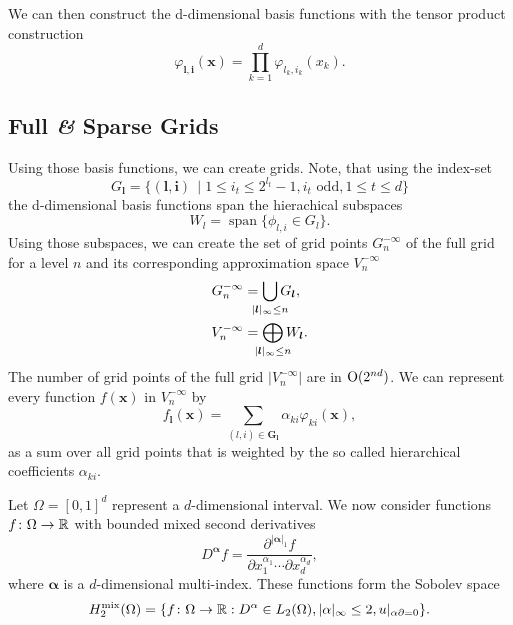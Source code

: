 We can then construct the d-dimensional basis functions with the tensor product construction~\cite{bungartzSparse}
\begin{equation*}
\varphi_{\bm{l}, \bm{i}} (\bm{x}) = \prod_{k=1}^d \varphi_{l_k, i_k} (x_k).
\end{equation*}

\subsection{Full \textit{\&} Sparse Grids}
Using those basis functions, we can create grids.
Note, that using the index-set~\cite{sparse-parsimony}
\begin{equation*}
 G_{\bm{l}} = \{(\bm{l, i}) \, \mid 1 \leq i_t \leq 2^{l_t} -1, i_t \text{ odd}, 1 \leq t \leq d\}
\end{equation*}
the d-dimensional basis functions span the hierachical subspaces
\begin{equation*}
  W_l = \operatorname{span}\{\phi_{l,i} \in G_l\}.
\end{equation*}
Using those subspaces, we can create the set of grid points \(G_n^{-\infty}\) of the full grid for a level \(n\) and its corresponding approximation space \(V_n^{-\infty}\)
\begin{align}
  G_n^{-\infty} &= \bigcup_{\mathclap{\vert {\bm{l}} \vert_\infty \leq n}} G_{\bm{l}}, \\
  V_n^{-\infty} &= \bigoplus_{\mathclap{\vert {\bm{l}} \vert_\infty \leq n}} W_{\bm{l}}.
\end{align}
The number of grid points of the full grid \(\vert V_n^{-\infty} \vert\) are in \( \operatorname{O} (2^{nd})\).
We can represent every function \(f(\bm{x})\) in \(V_n^{-\infty}\) by
\begin{equation}\label{eq:coefficients-h2mix}
  f_{\bm{l}}(\bm{x}) = \sum_{(l,i) \in \bm{G_l}} \alpha_{ki} \varphi_{ki}(\bm{x}),
\end{equation}
as a sum over all grid points that is weighted by the so called hierarchical coefficients \(\alpha_{ki}\).

Let \(\Omega = [0, 1]^d\) represent a \(d\)-dimensional interval. 
We now consider functions \(f \colon \Omega \to \mathbb{R}\) with bounded mixed second derivatives
\begin{equation*}
  D^{\bm{\alpha}} f = \frac{\partial^{\vert \bm{\alpha} \vert_1 } f}{\partial x^{\alpha_1}_1 \cdots \partial x^{\alpha_d}_d},
\end{equation*}
where \(\bm{\alpha}\) is a \(d\)-dimensional multi-index.
These functions form the Sobolev space
\begin{equation*}
  H_2^\text{mix}(\Omega) = \{ f \colon \Omega \to \mathbb{R} : D^\alpha \in L_2(\Omega), \vert \alpha \vert_\infty \leq 2, u \rvert_{\alpha \partial = 0}\}.
\end{equation*}

